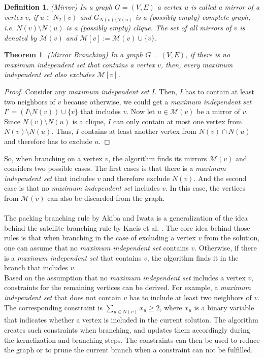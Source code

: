 \documentclass[]{article}
\newtheorem{theorem}{Theorem}
\newtheorem{definition}{Definition}
\begin{document}
\begin{definition} (Mirror)
	In a graph $G=(V,E)$ a vertex $u$ is called a mirror of a vertex $v$, if $u\in N_2(v)$ and $G_{N(v)\setminus N(u)}$ is a (possibly empty) complete graph, i.e. $N(v)\setminus N(u)$ is a (possibly empty) clique. The set of all mirrors of $v$ is denoted by $\mathcal{M}(v)$ and $\mathcal{M}[v] := \mathcal{M}(v)\cup\{v\}$.
\end{definition} 
\begin{theorem} (Mirror Branching)
	In a graph $G=(V,E)$, if there is no \textit{maximum independent set} that contains a vertex $v$, then, every \textit{maximum independent set} also excludes $\mathcal{M}[v]$.
\end{theorem}
\begin{proof}
	Consider any \textit{maximum independent set} $I$. Then, $I$ has to contain at least two neighbors of $v$ because otherwise, we could get a \textit{maximum independent set} $I'=(I\setminus N(v))\cup\{v\}$ that includes $v$. Now let $u\in\mathcal{M}(v)$ be a mirror of $v$. Since $N(v)\setminus N(u)$ is a clique, $I$ can only contain at most one vertex from $N(v)\setminus N(u)$. Thus, $I$ contains at least another vertex from $N(v)\cap N(u)$ and therefore has to exclude $u$.
\end{proof}

So, when branching on a vertex $v$, the algorithm finds its mirrors $\mathcal{M}(v)$ and considers two possible cases. The first cases is that there is a \textit{maximum independent set} that includes $v$ and therefore exclude $N(v)$. And the second case is that no \textit{maximum independent set} includes $v$. In this case, the vertices from $\mathcal{M}(v)$ can also be discarded from the graph.\\\\
The packing branching rule by Akiba and Iwata \cite{AkibaIwata} is a generalization of the idea behind the satellite branching rule by Kneis et al. \cite{Kneis}. The core idea behind those rules is that when branching in the case of excluding a vertex $v$ from the solution, one can assume that no \textit{maximum independent set} contains $v$. Otherwise, if there is a \textit{maximum independent set} that contains $v$, the algorithm finds it in the branch that includes $v$.\\
Based on the assumption that no \textit{maximum independent set} includes a vertex $v$, constraints for the remaining vertices can be derived. For example, a \textit{maximum independent set} that does not contain $v$ has to include at least two neighbors of $v$. The corresponding constraint is $\sum_{u\in N(v)}x_u \geq2$, where $x_u$ is a binary variable that indicates whether a vertex is included in the current solution. The algorithm creates such constraints when branching, and updates them accordingly during the kernelization and branching steps. The constraints can then be used to reduce the graph or to prune the current branch when a constraint can not be fulfilled.
\end{document}
